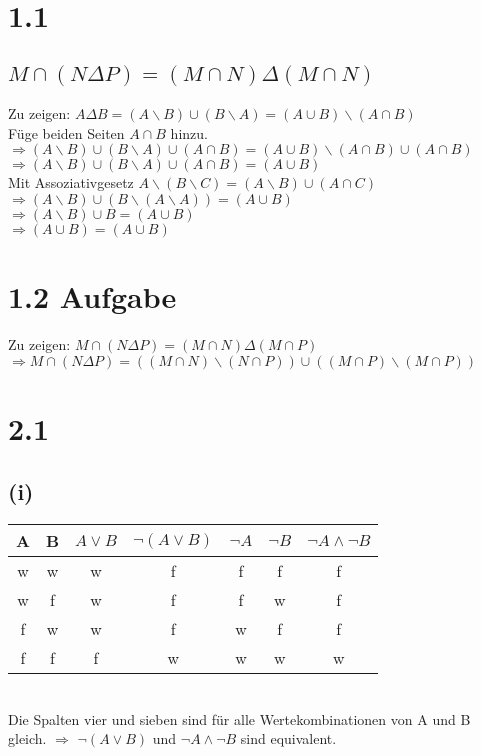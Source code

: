 \documentclass{article}
\begin{document}
    \section{1.1}
    \subsection{\(M \cap ( N \Delta P) = (M \cap N) \Delta (M \cap N) \)}
    Zu zeigen: \( A \Delta B = (A \backslash B ) \cup ( B \backslash A ) = (A \cup B) \backslash ( A \cap B) \) \\
    Füge beiden Seiten \( A \cap B \) hinzu. \\
    \(\Rightarrow (A \backslash B ) \cup ( B \backslash A ) \cup ( A \cap B ) = ( A \cup B ) \backslash ( A \cap B ) \cup ( A \cap B ) \) \\
    \(\Rightarrow (A \backslash B ) \cup ( B \backslash A ) \cup ( A \cap B ) = (A \cup B) \) \\
    Mit Assoziativgesetz \(A \backslash (B \backslash C) = (A \backslash B) \cup (A \cap C) \) \\
    \(\Rightarrow (A \backslash B ) \cup ( B \backslash (A \backslash A) ) = (A \cup B) \) \\
    \(\Rightarrow (A \backslash B ) \cup B = (A \cup B) \) \\
    \(\Rightarrow ( A \cup B ) = (A \cup B) \) \\

    \section{1.2 Aufgabe}
    Zu zeigen: \(M \cap (N \Delta P) = (M \cap N) \Delta (M \cap P) \) \\
    \(\Rightarrow M \cap (N \Delta P) = ((M \cap N) \backslash (N \cap P)) \cup ((M \cap P) \backslash (M \cap P))\)


    \section{2.1}
    \subsection{(i)}
    \begin{tabular}{c c c c c c c}
        A & B & \( A \lor B \) & \( \lnot ( A \lor B) \) & \( \lnot A \) & \( \lnot B \) & \( \lnot A \land \lnot B \) \\
        \midrule
        w & w & w & f & f & f & f\\
        w & f & w & f & f & w & f\\
        f & w & w & f & w & f & f\\
        f & f & f & w & w & w & w\\
    \end{tabular} \\
    Die Spalten vier und sieben sind für alle Wertekombinationen von A und B gleich.
    \( \Rightarrow \) \( \lnot ( A \lor B) \) und \( \lnot A \land \lnot B \) sind equivalent.
\end{document}
